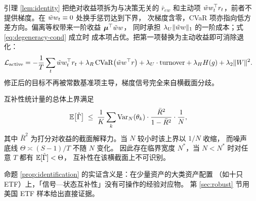 引理 \ref{lem:identity} 把绝对收益项拆为与决策无关的 $\bar r_{ew}$ 和主动项
$\tilde{w} w_t^\top r_t$，前者不提供梯度。在 $\tilde{w} w_t\equiv0$ 处换手惩罚达到下界，
次梯度含零，CVaR 项亦指向低方差方向。偏离等权带来一阶收益 $\boldsymbol{\mu}^\top\tilde{w} w$，
同时承担 $\lambda_U\|\tilde{w} w\|_1$ 的一阶成本；式 \eqref{eq:degeneracy-cond} 成立时
成本项占优。把第一项替换为主动收益即可消除退化：
\begin{equation}
\mathcal{L}_{\text{active}}=-\frac1T\sum_t\tilde{w} w_t^\top r_t
+\lambda_R\,\mathrm{CVaR}\big(\tilde{w} w^\top r\big)
+\lambda_U\cdot\text{turnover}+\lambda_H H(g)+\lambda_2\|W\|^2 .
\label{eq:active-objective}
\end{equation}
修正后的目标不再被常数基准项主导，梯度信号完全来自横截面分歧。

\begin{proposition}[窄横截面下的不可识别性]
\label{prop:identification}
互补性统计量的总体上界满足
\begin{equation}
\mathbb{E}\big[\hat\Gamma\big]\;\le\;\frac{1}{K}\sum_k\mathrm{Var}_N(\theta_k)\cdot
\frac{\bar R^2}{1-\bar R^2}\cdot\frac{1}{N},
\end{equation}
其中 $\bar R^2$ 为打分对收益的截面解释力。当 $N$ 较小时该上界以 $1/N$ 收缩，
而噪声底线 $\Theta\asymp(S-1)/T$ 不随 $N$ 变化。
因此存在临界宽度 $N^\ast$，当 $N<N^\ast$ 时对任意 $T$ 都有 $\mathbb{E}[\hat\Gamma]<\Theta$，
互补性在该横截面上不可识别。
\end{proposition}

命题 \ref{prop:identification} 的实证含义是：在少量资产的大类资产配置
（如十只 ETF）上，「信号—状态互补性」没有可操作的经验对应物。
第 \ref{sec:robust} 节用美国 ETF 样本给出直接证据。

